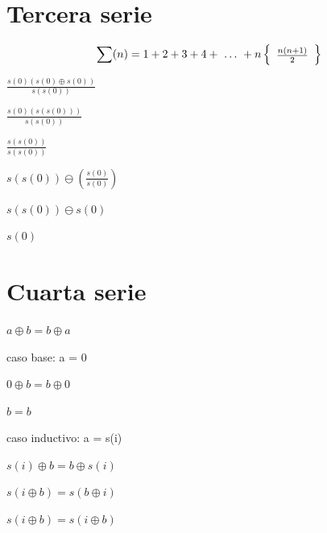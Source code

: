 \documentclass{article}
\begin{document}
\section{Tercera serie}
\[
        \sum(n)=1+2+3+4+\ \ldots\ +n
        \left\{
        \begin{array}{l l}
          \frac{n(n + 1)}{2}
        \end{array}
        \right \}
\]
\begin{center}
   $ \frac{s(0) (s(0) \oplus s(0))}{s(s(0))}$
\end{center}
\begin{center}
    $ \frac{s(0) (s(s(0)))}{s(s(0))}$
\end{center}
\begin{center}
    $ \frac{s(s(0))}{s(s(0))}$
\end{center}
\begin{center}
    $ s(s(0)) \ominus (\frac{s(0)}{s(0)})$
\end{center}
\begin{center}
    $s(s(0)) \ominus s(0)$
\end{center}
\begin{center}
    $s(0)$
\end{center}
\section{Cuarta serie}
$a \oplus b = b \oplus a$
\begin{center}
    caso base: a = 0
\end{center}
\begin{center}
    $0 \oplus b = b \oplus 0$
\end{center}
\begin{center}
   $ b = b$
\end{center}
\begin{center}
    caso inductivo: a = s(i)
\end{center}
\begin{center}
    $s(i) \oplus b = b \oplus s(i)$
\end{center}\begin{center}
    $s(i \oplus b) = s(b \oplus i)$
\end{center}\begin{center}
    $s(i \oplus b) = s(i \oplus b)$
\end{center}
\end{document}
